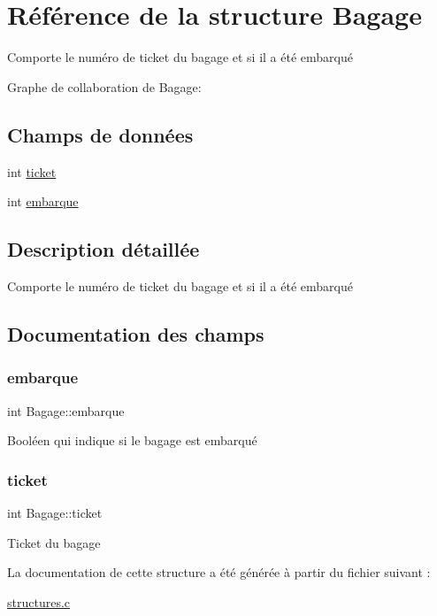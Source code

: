 \hypertarget{structBagage}{}\section{Référence de la structure Bagage}
\label{structBagage}


Comporte le numéro de ticket du bagage et si il a été embarqué  




Graphe de collaboration de Bagage\+:
\subsection*{Champs de données}
\begin{DoxyCompactItemize}
\item 
int \hyperlink{structBagage_a9e01cd8690e55493b66f59b8340888b5}{ticket}
\item 
int \hyperlink{structBagage_ad1d6155ef7a2c29b4b83db4a0c464d42}{embarque}
\end{DoxyCompactItemize}


\subsection{Description détaillée}
Comporte le numéro de ticket du bagage et si il a été embarqué 

\subsection{Documentation des champs}
\mbox{\label{structBagage_ad1d6155ef7a2c29b4b83db4a0c464d42}} 
\subsubsection{\texorpdfstring{embarque}{embarque}}
{\footnotesize\ttfamily int Bagage\+::embarque}

Booléen qui indique si le bagage est embarqué \mbox{\label{structBagage_a9e01cd8690e55493b66f59b8340888b5}} 
\subsubsection{\texorpdfstring{ticket}{ticket}}
{\footnotesize\ttfamily int Bagage\+::ticket}

Ticket du bagage 

La documentation de cette structure a été générée à partir du fichier suivant \+:\begin{DoxyCompactItemize}
\item 
\hyperlink{structures_8c}{structures.\+c}\end{DoxyCompactItemize}
